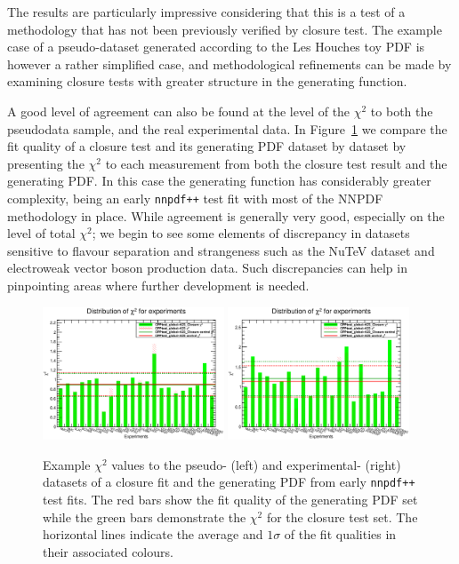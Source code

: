 The results are particularly impressive considering that this is a test of a methodology that has not been previously verified by closure test. The example case of a pseudo-dataset generated according to the Les Houches toy PDF is however a rather simplified case, and methodological refinements can be made by examining closure tests with greater structure in the generating function.

A good level of agreement can also be found at the level of the $\chi^2$ to both the pseudodata sample, and the real experimental data. In Figure~\ref{fig:CPPclosurechi2} we compare the fit quality of a closure test and its generating PDF dataset by dataset by presenting the $\chi^2$ to each measurement from both the closure test result and the generating PDF. In this case the generating function has considerably greater complexity, being an early {\tt nnpdf++} test fit with most of the NNPDF methodology in place. While agreement is generally very good, especially on the level of total $\chi^2$; we begin to see some elements of discrepancy in datasets sensitive to flavour separation and strangeness such as the NuTeV dataset and electroweak vector boson production data. Such discrepancies can help in pinpointing areas where further development is needed.


\begin{figure}[!]
\centering
\includegraphics[width=0.48\textwidth]{7-PostLHC/figs/chi2_histo_nnpdf1.eps}
\includegraphics[width=0.48\textwidth]{7-PostLHC/figs/chi2_histo_nnpdf2.eps}
\caption[$\chi^2$ values to the pseudo- and experimental-datasets of a closure fit and the generating PDF]{Example $\chi^2$ values to the pseudo- (left) and experimental- (right) datasets of a closure fit and the generating PDF from early {\tt nnpdf++} test fits. The red bars show the fit quality of the generating PDF set while the green bars demonstrate the $\chi^2$ for the closure test set. The horizontal lines indicate the average and $1\sigma$ of the fit qualities in their associated colours.}
\label{fig:CPPclosurechi2}
\end{figure}

